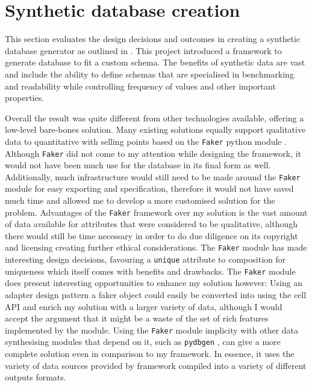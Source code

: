 \section{Synthetic database creation}
This section evaluates the design decisions and outcomes in creating a synthetic
database generator as outlined in . This
project introduced a framework to generate database to fit a custom schema. The
benefits of synthetic data are vast and include the ability to define schemas
that are specialised in benchmarking and readability while controlling frequency
of values and other important properties.

Overall the result was quite different from other technologies available,
offering a low-level bare-bones solution. Many existing solutions equally support
qualitative data to quantitative with selling points based on the
\lstinline{Faker} python module \cite{Faker}. Although \lstinline{Faker} did not come to my
attention while designing the framework, it would not have been much use for the
 database in its final form as well. Additionally, much
infrastructure would still need to be made around the \lstinline{Faker} module
for easy exporting and specification, therefore it would not have saved much
time and allowed me to develop a more customised solution for the problem.
Advantages of the \lstinline{Faker} framework over my solution is the vast
amount of data available for attributes that were considered to be qualitative,
although there would still be time necessary in order to do due diligence on its
copyright and licensing creating further ethical considerations. The \lstinline{Faker} module has made interesting
design decisions, favouring a \lstinline{unique} attribute to composition for
uniqueness which itself comes with benefits and drawbacks. The \lstinline{Faker}
module does present interesting opportunities to enhance my solution however:
Using an adapter design pattern a faker object could easily be converted into
using the cell API and enrich my solution with a larger variety of data,
although I would accept the argument that it might be a waste of the set of rich
features implemented by the module. Using the \lstinline{Faker} module implicity
with other data synthesising modules that depend on
it, such as \lstinline{pydbgen} \cite{pydbgen}, can give a more complete solution even in
comparison to my framework. In essence, it uses the variety of data sources
provided by framework compiled into a variety of different outputs formats.

